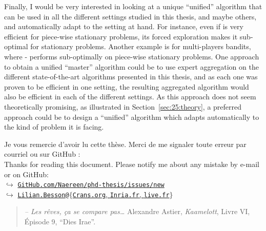 Finally, I would be very interested in looking at a unique ``unified'' algorithm that can be used in all the different settings studied in this thesis, and maybe others, and automatically adapt to the setting at hand.
For instance, even if \GLRklUCB{} is very efficient for piece-wise stationary problems, its forced exploration makes it sub-optimal for stationary problems.
Another example is for multi-players bandits, where \MCTopM-\klUCB{} performs sub-optimally on piece-wise stationary problems.
One approach to obtain a unified ``master'' algorithm could be to use expert aggregation on the different state-of-the-art algorithms presented in this thesis, and as each one was proven to be efficient in one setting, the resulting aggregated algorithm would also be efficient in each of the different settings.
As this approach does not seem theoretically promising, as illustrated in Section~\ref{sec:25:theory},
a preferred approach could be to design a ``unified'' algorithm which adapts automatically to the kind of problem it is facing.





\vfill{}

\hr{}

\begin{small}
\begin{center}
    Je vous remercie d'avoir lu cette thèse. Merci de me signaler toute erreur par courriel ou sur GitHub :
    \\
    Thanks for reading this document. Please notify me about any mistake by e-mail or on GitHub:\\
    $\hookrightarrow$ \href{https://github.com/Naereen/phd-thesis/issues/new}{\texttt{GitHub.com/Naereen/phd-thesis/issues/new}}\\
    $\hookrightarrow$ \href{mailto:Lilian.Besson_at_Crans.org}{\texttt{Lilian.Besson}\texttt{@}$\{$\texttt{Crans.org}, \texttt{Inria.fr}, \texttt{live.fr}$\}$}
\end{center}
\end{small}

\hr{}



\begin{small}
\begin{quote}
    \emph{-- Les rêves, ça se compare pas\ldots}
    Alexandre Astier, \emph{Kaamelott}, Livre VI, Épisode 9, ``Dies Irae''.
\end{quote}
\end{small}

